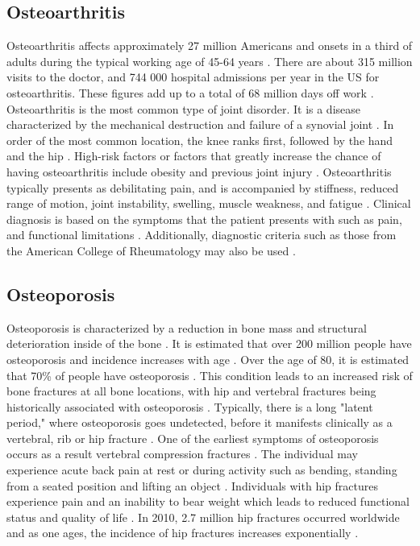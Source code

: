 \subsection{Osteoarthritis}
Osteoarthritis affects approximately 27 million Americans \cite{lespasio_hip_2018} and onsets in a third of adults during the typical working age of 45-64 years \cite{hootman_projections_2006}. There are about 315 million visits to the doctor, and 744 000 hospital admissions per year in the US for osteoarthritis. These figures add up to a total of 68 million days off work \cite{prieto-lhambra_osteoarthritis_2014}.
Osteoarthritis is the most common type of joint disorder. It is a disease characterized by the mechanical destruction and failure of a synovial joint \cite{hunter_osteoarthritis_2019}. In order of the most common location, the knee ranks first, followed by the hand and the hip \cite{hunter_osteoarthritis_2019}. High-risk factors or factors that greatly increase the chance of having osteoarthritis include obesity and previous joint injury \cite{prieto-lhambra_osteoarthritis_2014}. 
Osteoarthritis typically presents as debilitating pain, and is accompanied by stiffness, reduced range of motion, joint instability, swelling, muscle weakness, and fatigue \cite{hunter_osteoarthritis_2019}. Clinical diagnosis is based on the symptoms that the patient presents with such as pain, and functional limitations \cite{hunter_osteoarthritis_2019}. Additionally, diagnostic criteria such as those from the American College of Rheumatology may also be used \cite{hunter_osteoarthritis_2019,altman_development_1986}.

\subsection{Osteoporosis}
Osteoporosis is characterized by a reduction in bone mass and structural deterioration inside of the bone \cite{compston_osteoporosis_2019}. It is estimated that over 200 million people have osteoporosis and incidence increases with age \cite{porter_osteoporosis_2023}. Over the age of 80, it is estimated that 70\% of people have osteoporosis \cite{porter_osteoporosis_2023}. This condition leads to an increased risk of bone fractures at all bone locations, with hip and vertebral fractures being historically associated with osteoporosis \cite{compston_osteoporosis_2019}. Typically, there is a long "latent period," where osteoporosis goes undetected, before it manifests clinically as a vertebral, rib or hip fracture \cite{glaser_osteoporosis_1997}. One of the earliest symptoms of osteoporosis occurs as a result vertebral compression fractures \cite{glaser_osteoporosis_1997}. The individual may experience acute back pain at rest or during activity such as bending, standing from a seated position and lifting an object \cite{glaser_osteoporosis_1997}. Individuals with hip fractures experience pain and an inability to bear weight which leads to reduced functional status and quality of life \cite{compston_osteoporosis_2019}. In 2010, 2.7 million hip fractures occurred worldwide \cite{compston_osteoporosis_2019} and as one ages, the incidence of hip fractures increases exponentially \cite{compston_osteoporosis_2019}. 

